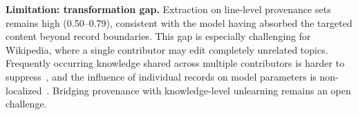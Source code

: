 \noindent\textbf{Limitation: transformation gap.} Extraction on line-level provenance sets remains high (0.50--0.79), consistent with the model having absorbed the targeted content beyond record boundaries. This gap is especially challenging for Wikipedia, where a single contributor may edit completely unrelated topics. Frequently occurring knowledge shared across multiple contributors is harder to suppress~\cite{krishnan2025notall}, and the influence of individual records on model parameters is non-localized~\cite{hammoudeh2024influence}. Bridging provenance with knowledge-level unlearning remains an open challenge.



